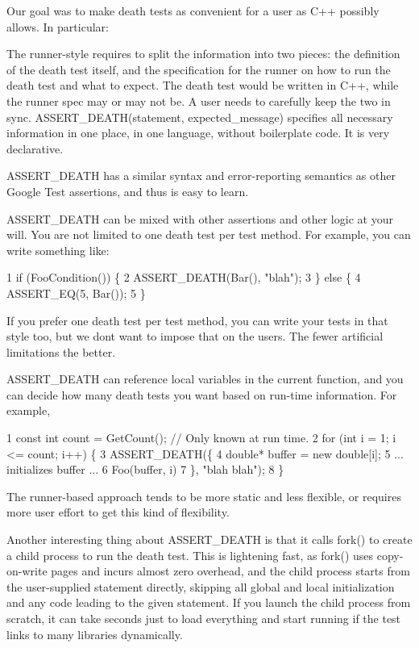 Our goal was to make death tests as convenient for a user as C++ possibly allows. In particular\+:


\begin{DoxyItemize}
\item The runner-\/style requires to split the information into two pieces\+: the definition of the death test itself, and the specification for the runner on how to run the death test and what to expect. The death test would be written in C++, while the runner spec may or may not be. A user needs to carefully keep the two in sync. {\ttfamily A\+S\+S\+E\+R\+T\+\_\+\+D\+E\+A\+T\+H(statement, expected\+\_\+message)} specifies all necessary information in one place, in one language, without boilerplate code. It is very declarative.
\item {\ttfamily A\+S\+S\+E\+R\+T\+\_\+\+D\+E\+A\+TH} has a similar syntax and error-\/reporting semantics as other Google Test assertions, and thus is easy to learn.
\item {\ttfamily A\+S\+S\+E\+R\+T\+\_\+\+D\+E\+A\+TH} can be mixed with other assertions and other logic at your will. You are not limited to one death test per test method. For example, you can write something like\+: 
\begin{DoxyCode}
1 if (FooCondition()) \{
2   ASSERT\_DEATH(Bar(), "blah");
3 \} else \{
4   ASSERT\_EQ(5, Bar());
5 \}
\end{DoxyCode}
 If you prefer one death test per test method, you can write your tests in that style too, but we don\textquotesingle{}t want to impose that on the users. The fewer artificial limitations the better.
\item {\ttfamily A\+S\+S\+E\+R\+T\+\_\+\+D\+E\+A\+TH} can reference local variables in the current function, and you can decide how many death tests you want based on run-\/time information. For example, 
\begin{DoxyCode}
1 const int count = GetCount();  // Only known at run time.
2 for (int i = 1; i <= count; i++) \{
3   ASSERT\_DEATH(\{
4     double* buffer = new double[i];
5     ... initializes buffer ...
6     Foo(buffer, i)
7   \}, "blah blah");
8 \}
\end{DoxyCode}
 The runner-\/based approach tends to be more static and less flexible, or requires more user effort to get this kind of flexibility.
\end{DoxyItemize}

Another interesting thing about {\ttfamily A\+S\+S\+E\+R\+T\+\_\+\+D\+E\+A\+TH} is that it calls {\ttfamily fork()} to create a child process to run the death test. This is lightening fast, as {\ttfamily fork()} uses copy-\/on-\/write pages and incurs almost zero overhead, and the child process starts from the user-\/supplied statement directly, skipping all global and local initialization and any code leading to the given statement. If you launch the child process from scratch, it can take seconds just to load everything and start running if the test links to many libraries dynamically.

